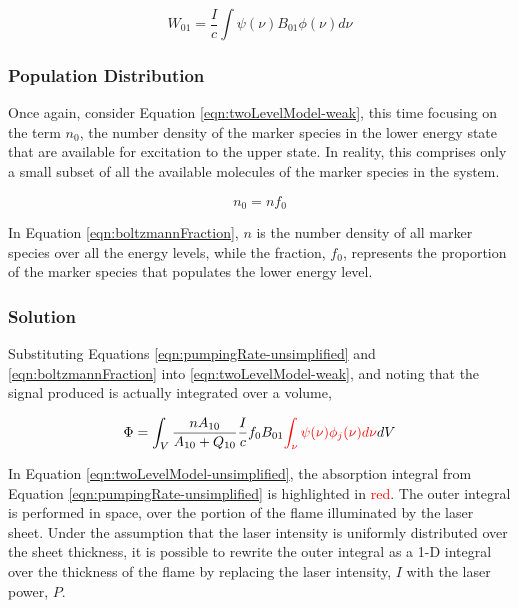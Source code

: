 \begin{equation}
  W_{01} = \frac{I}{c} \int \psi(\nu) B_{01}\phi(\nu) d\nu
  \label{eqn:pumpingRate-unsimplified}
\end{equation}

\subsubsection{Population Distribution}
\label{subsubsec:basic-model-population-distribution}

Once again, consider Equation \ref{eqn:twoLevelModel-weak}, this time focusing on the term \(n_0\), the number density of the marker species in the lower energy state that are available for excitation to the upper state.
In reality, this comprises only a small subset of all the available molecules of the marker species in the system.

\begin{equation}
  n_0 = nf_0
  \label{eqn:boltzmannFraction}
\end{equation}

In Equation \ref{eqn:boltzmannFraction}, \(n\) is the number density of all marker species over all the energy levels, while the fraction, \(f_0\), represents the proportion of the marker species that populates the lower energy level.

\subsubsection{Solution}
\label{subsubsec:basic-model-solution}

Substituting Equations \ref{eqn:pumpingRate-unsimplified} and \ref{eqn:boltzmannFraction} into \ref{eqn:twoLevelModel-weak}, and noting that the signal produced is actually integrated over a volume,

\begin{equation}
  \Phi = \int_V \frac{n A_{10}}{A_{10} + Q_{10}} \frac{I}{c} f_0 B_{01} \textcolor{red}{\int_\nu \psi(\nu) \phi_j(\nu) d\nu} dV
  \label{eqn:twoLevelModel-unsimplified}
\end{equation}

In Equation \ref{eqn:twoLevelModel-unsimplified}, the absorption integral from Equation \ref{eqn:pumpingRate-unsimplified} is highlighted in \textcolor{red}{red}.
The outer integral is performed in space, over the portion of the flame illuminated by the laser sheet.
Under the assumption that the laser intensity is uniformly distributed over the sheet thickness, it is possible to rewrite the outer integral as a 1-D integral over the thickness of the flame by replacing the laser intensity, \(I\) with the laser power, \(P\).

